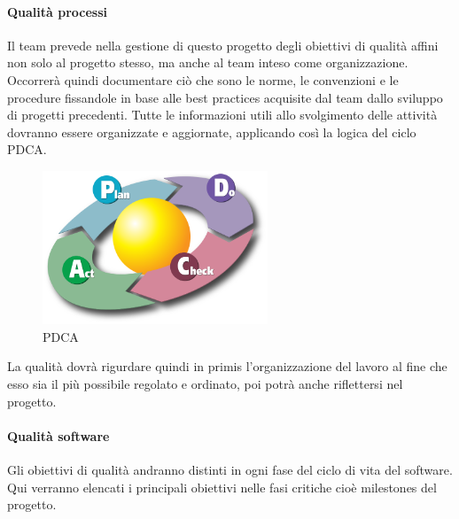 \paragraph*{Qualit\`{a} processi}

Il team prevede nella gestione di questo progetto degli obiettivi di qualit\`{a} affini non solo al progetto stesso, ma anche al team inteso come organizzazione. 
Occorrer\`{a} quindi documentare ci\`{o} che sono le norme, le convenzioni e le procedure fissandole in base alle best practices acquisite dal team dallo sviluppo di progetti precedenti. Tutte le informazioni utili allo svolgimento delle attivit\`{a} dovranno essere organizzate e aggiornate, applicando cos\`{i} la logica del ciclo PDCA.

\begin{figure}[H]
\begin{center}
\includegraphics[width=0.60\textwidth]{img/pdca.png}
\caption{PDCA}
\label{fig:PDCA}
\end{center}
\end{figure}

La qualit\`{a} dovr\`{a} rigurdare quindi in primis l\textquoteright{}organizzazione del lavoro al fine che esso sia il pi\`{u} possibile regolato e ordinato, poi potr\`{a} anche riflettersi nel progetto.

\paragraph*{Qualit\`{a} software}

Gli obiettivi di qualit\`{a} andranno distinti in ogni fase del ciclo di vita del software. Qui verranno elencati i principali obiettivi nelle fasi critiche cio\`{e} milestones del progetto.

